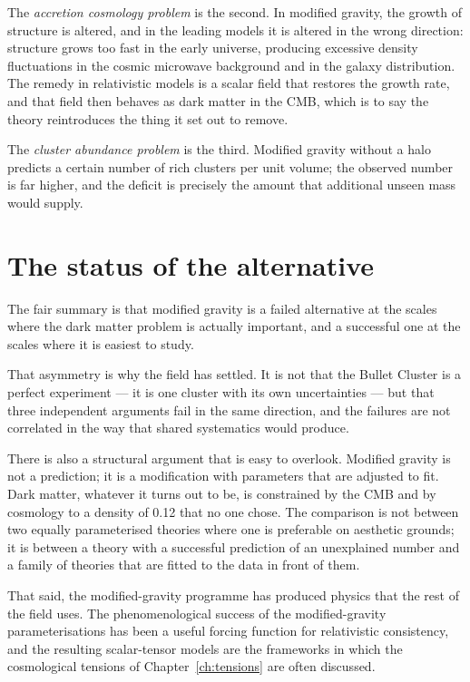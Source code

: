 The \emph{accretion cosmology problem} is the second. In modified gravity,
the growth of structure is altered, and in the leading models it is altered
in the wrong direction: structure grows too fast in the early universe,
producing excessive density fluctuations in the cosmic microwave background
and in the galaxy distribution. The remedy in relativistic models is a
scalar field that restores the growth rate, and that field then behaves as
dark matter in the CMB, which is to say the theory reintroduces the thing it
set out to remove.

The \emph{cluster abundance problem} is the third. Modified gravity without a
halo predicts a certain number of rich clusters per unit volume; the
observed number is far higher, and the deficit is precisely the amount that
additional unseen mass would supply.

\section{The status of the alternative}The fair summary is that modified gravity
is a failed alternative at the scales where the dark matter problem is
actually important, and a successful one at the scales where it is easiest to
study.

That asymmetry is why the field has settled. It is not that the Bullet
Cluster is a perfect experiment --- it is one cluster with its own
uncertainties --- but that three independent arguments fail in the same
direction, and the failures are not correlated in the way that shared
systematics would produce.

There is also a structural argument that is easy to overlook. Modified
gravity is not a prediction; it is a modification with parameters that are
adjusted to fit. Dark matter, whatever it turns out to be, is constrained by
the CMB and by cosmology to a density of 0.12 that no one chose. The
comparison is not between two equally parameterised theories where one is
preferable on aesthetic grounds; it is between a theory with a successful
prediction of an unexplained number and a family of theories that are fitted
to the data in front of them.

That said, the modified-gravity programme has produced physics that the rest
of the field uses. The phenomenological success of the modified-gravity
parameterisations has been a useful forcing function for relativistic
consistency, and the resulting scalar-tensor models are the frameworks in
which the cosmological tensions of Chapter~\ref{ch:tensions} are often
discussed.


